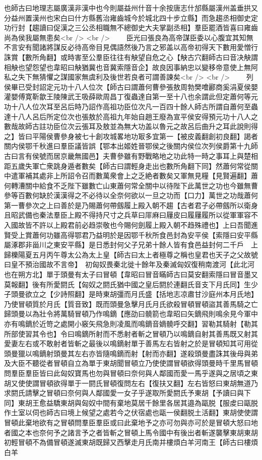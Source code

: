 也師古曰地理志屬廣漢非漢中也今則屬益州什音十余按唐志什邡縣屬漢州盖垂拱又分益州置漢州也宋白曰什方縣舊治雍齒城今於城北四十步立縣】而急趨丞相御史定功行封【趨讀曰促漢之三公丞相職無不總御史大夫掌副丞相】羣臣罷酒皆喜曰雍齒尚為侯我屬無患矣<br />
<br />
　　臣光曰張良為高帝謀臣委以心腹宜其知無不言安有聞諸將謀反必待高帝目見偶語然後乃言之邪盖以高帝初得天下數用愛憎行誅賞【數所角翻】或時害至公羣臣往往有觖望自危之心【觖古穴翻師古曰音决觖謂相觖也望怨望也韋昭曰觖猶冀也音冀索隱音企】故良因事納忠以變移帝意使上無阿私之失下無猜懼之謀國家無虞利及後世若良者可謂善諫矣<br />
<br />
　　列侯畢已受封詔定元功十八人位次【師古曰謂蕭何曹參張敖周勃樊噲酈商奚涓夏侯嬰灌嬰傅寛靳歙王陵陳武王吸薛歐周昌丁復蟲達自第一至十八也余謂此但定蕭何等元功十八人位次耳至呂后時乃詔作高祖功臣位次凡一百四十餘人師古所謂自蕭何至蟲達十八人呂后所定位次也張敖於高祖九年始自趙王廢為宣平侯安得預元功十八人之數哉故師古註功臣位次云張耳及敖並為無大功盖以魯元之故呂后曲升之耳此說則得之】皆曰平陽侯曹參身被七十創攻城畧地功冣多宜第一【被皮義翻創初良翻】謁者關内侯鄂千秋進曰羣臣議皆誤【鄂本出姬姓晉鄂侯之後關内侯位次列侯爵第十九師古曰言有侯號而居京畿無國邑】夫曹參雖有野戰略地之功此特一時之事耳上與楚相距五歲失軍亡衆跳身遁者數矣【師古曰謂輕身走出也數所角翻下同】然蕭何常從關中遣軍補其處非上所詔令召而數萬衆會上之乏絶者數矣又軍無見糧【見賢遍翻】蕭何轉漕關中給食不乏陛下雖數亡山東蕭何常全關中以待陛下此萬世之功也今雖無曹參等百數何缺於漢漢得之不必待以全奈何欲以一旦之功而【口力】萬世之功哉蕭何第一曹參次之上曰善於是乃賜蕭何帶劔履上殿入朝不趨【古者君子必帶劔所以衛身且昭武備也秦法羣臣上殿不得持尺寸之兵草曰厞麻曰屨皮曰履屨履所以從軍軍容不入國故皆不許以上殿君前必趋崇敬也今賜何劍履上殿入朝不趋殊禮也】上曰吾聞進賢受上賞蕭何功雖高得鄂君乃益明於是因鄂千秋所食邑封為安平侯【索隱曰安平縣屬涿郡非甾川之東安平縣】是日悉封何父子兄弟十餘人皆有食邑益封何二千戶　上歸櫟陽夏五月丙午尊太公為太上皇【師古曰太上者極尊之稱也皇君也天子之父故號曰皇不預治國故不言帝】　初匈奴畏秦北徙十餘年及秦滅匈奴復稍南渡河【此北河也在朔方北】單于頭曼有太子曰冒頓【韋昭曰冒音瞞師古曰莫安翻索隱曰冒音墨又莫報翻】後有所愛閼氏【匈奴之閼氏猶中國之皇后閼於連翻氏音支下月氏同】生少子頭曼欲立之【少詩照翻】是時東胡彊而月氏盛【括地志凉肅甘沙庭州本月氏地】乃使冒頓質於月氏【質音致】既而頭曼急擊月氏月氏欲殺冒頓冒頓盜其善馬騎之亡歸頭曼以為壯令將萬騎冒頓乃作鳴鏑【應劭曰髐箭也韋昭曰矢鏑飛則鳴余見今軍中亦有鳴鏑於近笴之處開小竅矢飛急則凌風而鳴鏑音嫡髐呼交翻】習勒其騎射【勒其所部使習其令也】令曰鳴鏑所射而不悉射者斬之冒頓乃以鳴鏑自射其善馬既又射其愛妻左右或不敢射者皆斬之最後以鳴鏑射單于善馬左右皆射之於是冒頓知其可用從頭曼獵以鳴鏑射頭曼其左右亦皆隨鳴鏑而射【射而亦翻】遂殺頭曼盡誅其後母與弟及大臣不聽從者冒頓自立為單于東胡聞冒頓立乃使使謂冒頓欲得頭曼時千里馬冒頓問羣臣羣臣皆曰此匈奴寶馬也勿與冒頓曰奈何與人鄰國而愛一馬乎遂與之居頃之東胡又使使謂冒頓欲得單于一閼氏冒頓復問左右【復扶又翻】左右皆怒曰東胡無道乃求閼氏請擊之冒頓曰奈何與人鄰國愛一女子乎遂取所愛閼氏予東胡【予讀曰與下同】東胡王愈益驕東胡與匈奴中間有棄地莫居千餘里各居其邉為甌脱【服䖍曰甌脱作土室以伺也師古曰境上候望之處若今之伏宿處也甌一侯翻脱土活翻】東胡使使謂冒頓此棄地欲有之冒頓問羣臣羣臣或曰此棄地予之亦可勿與亦可於是冒頓大怒曰地者國之本也奈何予之諸言予之者皆斬之冒頓上馬令國中有後出者斬遂襲擊東胡東胡初輕冒頓不為備冒頓遂滅東胡既歸又西擊走月氏南并樓煩白羊河南王【師古曰樓煩白羊